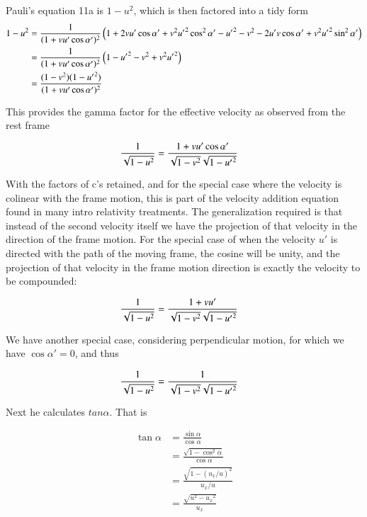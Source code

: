 \documentclass{article}
\begin{document}
Pauli's equation 11a is $1-u^2$, which is then factored into a tidy form
\begin{align*}
1- u^2
&= \frac{1}{( 1 + v u' \cos\alpha' )^2 } \left(
1 
+ 2 v u' \cos\alpha' 
+v^2 {u'}^2 \cos^2\alpha' 
-{{u}'}^2
-v^2 
- 2 u' v \cos\alpha' 
+v^2 {u'}^2 \sin^2\alpha'
\right) \\
&= \frac{1}{( 1 + v u' \cos\alpha' )^2 } \left(
1 
-{{u}'}^2
-v^2 
+v^2 {u'}^2 
\right) \\
&= \frac{(1 -v^2 ) (1 -{{u}'}^2)}
{( 1 + v u' \cos\alpha' )^2 }
\end{align*}

This provides the gamma factor for the effective velocity as observed from the rest frame

\begin{align*}
\frac{1}{\sqrt{1-u^2}} 
&= \frac{ 1 + v u' \cos\alpha' }{\sqrt{1 -v^2 }\sqrt{1 -{u'}^2}}
\end{align*}

With the factors of c's retained, and for the special case where the velocity is colinear with the frame motion, this is part of the velocity addition equation found in many intro relativity treatments.  The generalization required is that instead of the second velocity itself we have the projection of that velocity
in the direction of the frame motion.
For the special
case of when the velocity $u'$ is directed with the path of the moving frame,
the cosine will be unity, and the projection of that velocity in the frame motion direction is exactly the velocity to be compounded:

\begin{align*}
\frac{1}{\sqrt{1-u^2}} 
&= \frac{ 1 + v u' }{\sqrt{1 -v^2 }\sqrt{1 -{u'}^2}}
\end{align*}

We have another special case, considering perpendicular motion, for which we have $\cos\alpha' = 0$, and thus

\begin{align*}
\frac{1}{\sqrt{1-u^2}} 
&= \frac{ 1 }{\sqrt{1 -v^2 }\sqrt{1 -{u'}^2}}
\end{align*}

Next he calculates $tan \alpha$.  That is

\begin{align*}
\tan\alpha 
&= \frac{\sin\alpha}{\cos\alpha} \\
&= \frac{\sqrt{1-\cos^2\alpha}}{\cos\alpha} \\
&= \frac{\sqrt{1-(u_x/u)^2}}{u_x/u} \\
&= \frac{\sqrt{u^2- {u_x}^2}}{u_x} \\
\end{align*}
\end{document}
